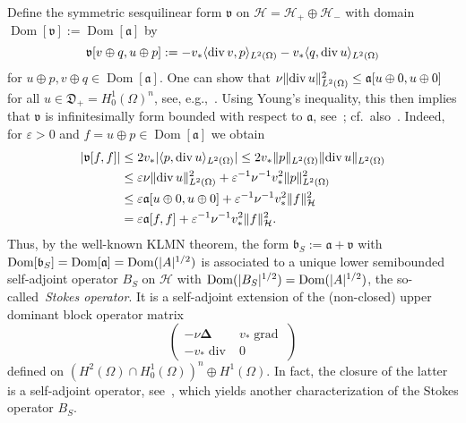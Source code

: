 \documentclass[11pt,a4paper]{amsart}
\numberwithin{equation}{section}
\DeclareMathOperator{\Dom}{Dom}
\DeclareMathOperator{\divgc}{div}
\DeclareMathOperator{\grad}{grad}
\DeclarePairedDelimiter{\abs}{|}{|}
\DeclarePairedDelimiter{\norm}{\lVert}{\rVert}
\DeclarePairedDelimiter{\scprod}{\langle}{\rangle}
\newcommand{\eps}{\varepsilon}
\newcommand{\cH}{{\mathcal H}}
\newcommand{\fa}{{\mathfrak a}}
\newcommand{\fb}{{\mathfrak b}}
\newcommand{\fv}{{\mathfrak v}}
\newcommand{\fD}{{\mathfrak D}}
\theoremstyle{plain}
\theoremstyle{definition}
\theoremstyle{remark}
\begin{document}
Define the symmetric sesquilinear form $\fv$ on $\cH = \cH_+ \oplus \cH_-$ with domain $\Dom[\fv] := \Dom[\fa]$ by
\begin{equation*}
  \fv[ v \oplus q , u \oplus p ]
  :=
  -v_* \scprod{ \divgc v , p }_{L^2(\Omega)} - v_* \scprod{ q , \divgc u }_{L^2(\Omega)}
\end{equation*}
for $u \oplus p, v \oplus q \in \Dom[\fa]$. One can show that
$\nu\norm{\divgc u}_{L^2(\Omega)}^2 \le \fa[u \oplus 0 , u \oplus 0]$ for all $u \in \fD_+ = H_0^1(\Omega)^n$, see,
e.g.,~\cite[Proof of Theorem~5.12]{SchmDiss}. Using Young's inequality, this then implies that $\fv$ is infinitesimally form
bounded with respect to $\fa$, see~\cite[Remark~5.1.3]{SchmDiss}; cf.~also~\cite[Section~2]{GKMSV19}. Indeed, for $\eps > 0$ and
$f = u \oplus p \in \Dom[\fa]$ we obtain
\begin{equation}\label{eq:StokesRelBound}
 \begin{aligned}
  \abs{\fv[f , f]}
  &\le
  2 v_* \abs{ \scprod{ p , \divgc u }_{L^2(\Omega)} }
    \le
    2 v_* \norm{p}_{L^2(\Omega)} \norm{\divgc u}_{L^2(\Omega)}\\
  &\le
  \eps \nu \norm{\divgc u}_{L^2(\Omega)}^2 + \eps^{-1} \nu^{-1} v_*^2 \norm{p}_{L^2(\Omega)}^2\\
  &\le
  \eps \fa[ u \oplus 0 , u \oplus 0 ] + \eps^{-1} \nu^{-1} v_*^2 \norm{f}_\cH^2\\
  &=
  \eps \fa[ f , f ] + \eps^{-1} \nu^{-1} v_*^2 \norm{f}_\cH^2
  .
 \end{aligned}
\end{equation}
Thus, by the well-known KLMN theorem, the form $\fb_S := \fa + \fv$ with $\Dom[\fb_S] = \Dom[\fa] = \Dom(\abs{A}^{1/2})$ is
associated to a unique lower semibounded self-adjoint operator $B_S$ on $\cH$ with $\Dom(\abs{B_S}^{1/2}) = \Dom(\abs{A}^{1/2})$,
the so-called~\emph{Stokes operator}. It is a self-adjoint extension of the (non-closed) upper dominant block operator matrix
\begin{equation*}
  \begin{pmatrix}
    -\nu\mathbf{\Delta} & v_*\grad\\
    -v_*\divgc & 0
  \end{pmatrix}
\end{equation*}
defined on $(H^2(\Omega) \cap H_0^1(\Omega))^n \oplus H^1(\Omega)$. In fact, the closure of the latter is a self-adjoint
operator, see~\cite[Theorems~3.7 and~3.9]{FFMM00}, which yields another characterization of the Stokes operator $B_S$.
\end{document}
